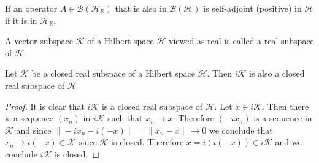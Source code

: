 \begin{theorem}
If an operator $A\in\mathcal{B}(\mathcal{H}_\mathbb{R})$ that is also in $\mathcal{B}(\mathcal{H})$ is self-adjoint (positive) in $\mathcal{H}$ if it is in $\mathcal{H}_\mathbb{R}$.
\end{theorem}

\begin{definition}
A vector subspace $\mathcal{K}$ of a Hilbert space $\mathcal{H}$ viewed as real is called a real subspace of $\mathcal{H}$.
\end{definition}

\begin{theorem}
Let $\mathcal{K}$ be a closed real subspace of a Hilbert space $\mathcal{H}$. Then $i\mathcal{K}$ is also a closed real subspace of $\mathcal{H}$
\end{theorem} 

\begin{proof}
It is clear that $i\mathcal{K}$ is a closed real subspace of $\mathcal{H}$. Let $x\in\overline{i\mathcal{K}}$. Then there is a sequence $(x_n)$ in $i\mathcal{K}$ such that $x_n\rightarrow x$. Therefore $(-ix_n)$ is a sequence in $\mathcal{K}$ and since $\|-ix_n-i(-x)\|=\|x_n-x\|\rightarrow 0$ we conclude that $x_n\rightarrow i(-x)\in\mathcal{K}$ since $\mathcal{K}$ is closed. Therefore $x=i(i(-x))\in i\mathcal{K}$ and we conclude $i\mathcal{K}$ is closed.  
\end{proof}
